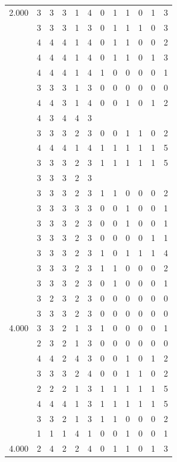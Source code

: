 \documentclass[]{book}
\theoremstyle{definition}
\theoremstyle{definition}
\theoremstyle{definition}
\theoremstyle{remark}
\begin{document}
\begin{table}
{\begin{tabular}[t]{rrrrrrrrrrrr}
2.000 & 3 & 3 & 3 & 1 & 4 & 0 & 1 & 1 & 0 & 1 & 3\\
 & 3 & 3 & 3 & 1 & 3 & 0 & 1 & 1 & 1 & 0 & 3\\
 & 4 & 4 & 4 & 1 & 4 & 0 & 1 & 1 & 0 & 0 & 2\\
 & 4 & 4 & 4 & 1 & 4 & 0 & 1 & 1 & 0 & 1 & 3\\
 & 4 & 4 & 4 & 1 & 4 & 1 & 0 & 0 & 0 & 0 & 1\\
 & 3 & 3 & 3 & 1 & 3 & 0 & 0 & 0 & 0 & 0 & 0\\
 & 4 & 4 & 3 & 1 & 4 & 0 & 0 & 1 & 0 & 1 & 2\\
 & 4 & 3 & 4 & 4 & 3 &  &  &  &  &  & \\
 & 3 & 3 & 3 & 2 & 3 & 0 & 0 & 1 & 1 & 0 & 2\\
 & 4 & 4 & 4 & 1 & 4 & 1 & 1 & 1 & 1 & 1 & 5\\
 & 3 & 3 & 3 & 2 & 3 & 1 & 1 & 1 & 1 & 1 & 5\\
 & 3 & 3 & 3 & 2 & 3 &  &  &  &  &  & \\
 & 3 & 3 & 3 & 2 & 3 & 1 & 1 & 0 & 0 & 0 & 2\\
 & 3 & 3 & 3 & 3 & 3 & 0 & 0 & 1 & 0 & 0 & 1\\
 & 3 & 3 & 3 & 2 & 3 & 0 & 0 & 1 & 0 & 0 & 1\\
 & 3 & 3 & 3 & 2 & 3 & 0 & 0 & 0 & 0 & 1 & 1\\
 & 3 & 3 & 3 & 2 & 3 & 1 & 0 & 1 & 1 & 1 & 4\\
 & 3 & 3 & 3 & 2 & 3 & 1 & 1 & 0 & 0 & 0 & 2\\
 & 3 & 3 & 3 & 2 & 3 & 0 & 1 & 0 & 0 & 0 & 1\\
 & 3 & 2 & 3 & 2 & 3 & 0 & 0 & 0 & 0 & 0 & 0\\
 & 3 & 3 & 3 & 2 & 3 & 0 & 0 & 0 & 0 & 0 & 0\\
4.000 & 3 & 3 & 2 & 1 & 3 & 1 & 0 & 0 & 0 & 0 & 1\\
 & 2 & 3 & 2 & 1 & 3 & 0 & 0 & 0 & 0 & 0 & 0\\
 & 4 & 4 & 2 & 4 & 3 & 0 & 0 & 1 & 0 & 1 & 2\\
 & 3 & 3 & 3 & 2 & 4 & 0 & 0 & 1 & 1 & 0 & 2\\
 & 2 & 2 & 2 & 1 & 3 & 1 & 1 & 1 & 1 & 1 & 5\\
 & 4 & 4 & 4 & 1 & 3 & 1 & 1 & 1 & 1 & 1 & 5\\
 & 3 & 3 & 2 & 1 & 3 & 1 & 1 & 0 & 0 & 0 & 2\\
 & 1 & 1 & 1 & 4 & 1 & 0 & 0 & 1 & 0 & 0 & 1\\
4.000 & 2 & 4 & 2 & 2 & 4 & 0 & 1 & 1 & 0 & 1 & 3\\

\end{tabular}}
\end{table}
\end{document}
